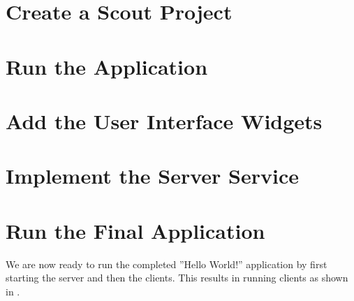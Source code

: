 \documentclass{article}
\begin{document}
\section*{Create a Scout Project}

\section*{Run the Application}

\section*{Add the User Interface Widgets}

\section*{Implement the Server Service}


\section*{Run the Final Application}

We are now ready to run the completed ''Hello World!'' application by first starting the server and then the clients. 
This results in running clients as shown in . 
\end{document}
